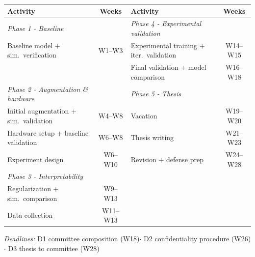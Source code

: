 \begin{table}[h]
\footnotesize
\setlength{\tabcolsep}{5pt}
\renewcommand{\arraystretch}{1.05}
\begin{tabular}{@{}lc@{\hspace{1.8em}}lc@{}}
\toprule
\textbf{Activity} & \textbf{Weeks} & \textbf{Activity} & \textbf{Weeks} \\
\midrule
\textit{Phase 1 - Baseline}             &        & \textit{Phase 4 - Experimental validation} & \\
\quad Baseline model + sim.\ verification & W1--W3 & \quad Experimental training + iter.\ validation & W14--W15 \\
                                          &        & \quad Final validation + model comparison        & W16--W18 \\
\textit{Phase 2 - Augmentation \& hardware} & & \textit{Phase 5 - Thesis} & \\
\quad Initial augmentation + sim.\ validation & W4--W8  & \quad Vacation                    & W19--W20 \\
\quad Hardware setup + baseline validation    & W6--W8  & \quad Thesis writing               & W21--W23 \\
\quad Experiment design                       & W6--W10 & \quad Revision + defense prep      & W24--W28 \\
\textit{Phase 3 - Interpretability}     &         & & \\
\quad Regularization + sim.\ comparison & W9--W13  & & \\
\quad Data collection                   & W11--W13 & & \\
\bottomrule
\end{tabular}

\vspace{0.4em}
\noindent\textit{Deadlines:}\enspace
D1 committee composition (W18)\enspace$\cdot$\enspace
D2 confidentiality procedure (W26)\enspace$\cdot$\enspace
D3 thesis to committee (W28)
\end{table}